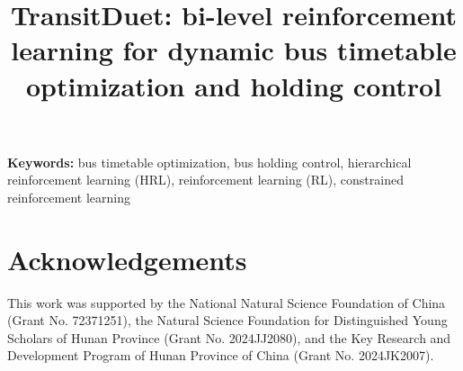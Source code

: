 \documentclass[10pt]{article}
\title{TransitDuet: bi-level reinforcement learning for dynamic bus timetable optimization and holding control}
\author{}
\date{}
\begin{document}
\maketitle



{\small
\begin{sloppypar}
\noindent \textbf{Keywords:} bus timetable optimization, bus holding control, hierarchical reinforcement learning (HRL), reinforcement learning (RL), constrained reinforcement learning
\end{sloppypar}
}










\appendix


\section*{Acknowledgements}
\begin{sloppypar}
This work was supported by the National Natural Science Foundation of China (Grant No. 72371251), the Natural Science Foundation for Distinguished Young Scholars of Hunan Province (Grant No. 2024JJ2080), and the Key Research and Development Program of Hunan Province of China (Grant No. 2024JK2007).
\end{sloppypar}

\clearpage
\FloatBarrier



\end{document}
